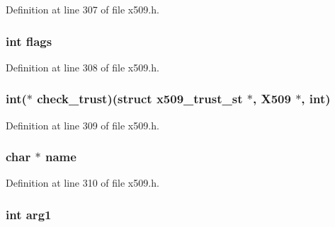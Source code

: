 Definition at line 307 of file x509.\+h.

\subsubsection[{\texorpdfstring{flags}{flags}}]{\setlength{\rightskip}{0pt plus 5cm}int flags}\hypertarget{structx509__trust__st_ac8bf36fe0577cba66bccda3a6f7e80a4}{}\label{structx509__trust__st_ac8bf36fe0577cba66bccda3a6f7e80a4}


Definition at line 308 of file x509.\+h.

\subsubsection[{\texorpdfstring{check\+\_\+trust}{check_trust}}]{\setlength{\rightskip}{0pt plus 5cm}int($\ast$ check\+\_\+trust)(struct {\bf x509\+\_\+trust\+\_\+st} $\ast$, {\bf X509} $\ast$, int)}\hypertarget{structx509__trust__st_a62b245258f7c59c65e6d42bb0aaa9daf}{}\label{structx509__trust__st_a62b245258f7c59c65e6d42bb0aaa9daf}


Definition at line 309 of file x509.\+h.

\subsubsection[{\texorpdfstring{name}{name}}]{\setlength{\rightskip}{0pt plus 5cm}char $\ast$ name}\hypertarget{structx509__trust__st_ad547fb8186b526cb1b588daad4334fbe}{}\label{structx509__trust__st_ad547fb8186b526cb1b588daad4334fbe}


Definition at line 310 of file x509.\+h.

\subsubsection[{\texorpdfstring{arg1}{arg1}}]{\setlength{\rightskip}{0pt plus 5cm}int arg1}\hypertarget{structx509__trust__st_a7c04804f84b92c51293bd83351e2c9cc}{}\label{structx509__trust__st_a7c04804f84b92c51293bd83351e2c9cc}


